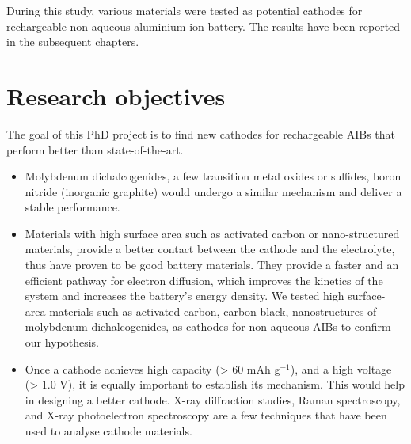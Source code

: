 During this study, various materials were tested as potential cathodes for rechargeable non-aqueous aluminium-ion battery. The results have been reported in the subsequent chapters.

\section{Research objectives}
The goal of this PhD project is to find new cathodes for rechargeable AIBs that perform better than state-of-the-art. 
\begin{itemize}
    \item Molybdenum dichalcogenides, a few transition metal oxides or sulfides, boron nitride (inorganic graphite) would undergo a similar mechanism and deliver a stable performance. 
    
    \item Materials with high surface area such as activated carbon or nano-structured materials, provide a better contact between the cathode and the electrolyte, thus have proven to be good battery materials. They provide a faster and an efficient pathway for electron diffusion, which improves the kinetics of the system and increases the battery's energy density. We tested high surface-area materials such as activated carbon, carbon black, nanostructures of molybdenum dichalcogenides, as cathodes for non-aqueous AIBs to confirm our hypothesis.
    
    \item Once a cathode achieves high capacity (> 60 mAh g$^{-1}$), and a high voltage (> 1.0 V), it is equally important to establish its mechanism. This would help in designing a better cathode. X-ray diffraction studies, Raman spectroscopy, and X-ray photoelectron spectroscopy are a few techniques that have been used to analyse cathode materials. 

\end{itemize}







